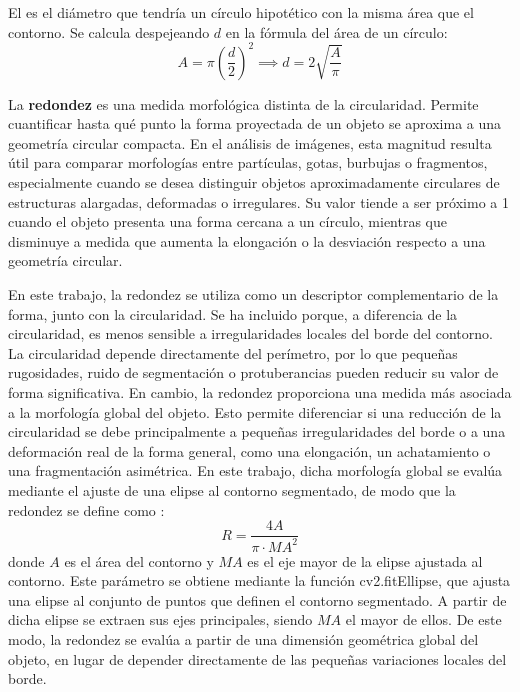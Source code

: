 El  es el diámetro que tendría un círculo hipotético con la misma área que el contorno. Se calcula despejeando $d$ en la fórmula del área de un círculo:
\begin{equation}
    A = \pi \left(\frac{d}{2}\right)^2 \implies d = 2\sqrt{\frac{A}{\pi}}
\end{equation}

La \textbf{redondez} es una medida morfológica distinta de la circularidad. Permite cuantificar hasta qué punto la forma proyectada de un objeto se aproxima a una geometría circular compacta. En el análisis de imágenes, esta magnitud resulta útil para comparar morfologías entre partículas, gotas, burbujas o fragmentos, especialmente cuando se desea distinguir objetos aproximadamente circulares de estructuras alargadas, deformadas o irregulares. Su valor tiende a ser próximo a 1 cuando el objeto presenta una forma cercana a un círculo, mientras que disminuye a medida que aumenta la elongación o la desviación respecto a una geometría circular.

En este trabajo, la redondez se utiliza como un descriptor complementario de la forma, junto con la circularidad. Se ha incluido porque, a diferencia de la circularidad, es menos sensible a irregularidades locales del borde del contorno. La circularidad depende directamente del perímetro, por lo que pequeñas rugosidades, ruido de segmentación o protuberancias pueden reducir su valor de forma significativa. En cambio, la redondez proporciona una medida más asociada a la morfología global del objeto. Esto permite diferenciar si una reducción de la circularidad se debe principalmente a pequeñas irregularidades del borde o a una deformación real de la forma general, como una elongación, un achatamiento o una fragmentación asimétrica. En este trabajo, dicha morfología global se evalúa mediante el ajuste de una elipse al contorno segmentado, de modo que la redondez se define como \cite{russ2011image} \cite{wadell1932roundness}:
\begin{equation}
    R = \frac{4A}{\pi \cdot MA^2}
\end{equation}
donde $A$ es el área del contorno y $MA$ es el eje mayor de la elipse ajustada al contorno. Este parámetro se obtiene mediante la función cv2.fitEllipse, que ajusta una elipse al conjunto de puntos que definen el contorno segmentado. A partir de dicha elipse se extraen sus ejes principales, siendo $MA$ el mayor de ellos. De este modo, la redondez se evalúa a partir de una dimensión geométrica global del objeto, en lugar de depender directamente de las pequeñas variaciones locales del borde.

